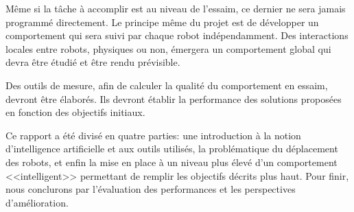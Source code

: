 Même si la tâche à accomplir est au niveau de l'essaim, ce dernier ne sera jamais programmé directement. Le principe même du projet est de développer un comportement qui sera suivi par chaque robot indépendamment. Des interactions locales entre robots, physiques ou non, émergera un comportement global qui devra être étudié et être rendu prévisible.

Des outils de mesure, afin de calculer la qualité du comportement en essaim, devront être élaborés. Ils devront établir la performance des solutions proposées en fonction des objectifs initiaux.~\cite{cahierCharges}

\vspace{1em}Ce rapport a été divisé en quatre parties: une introduction à la notion d'intelligence artificielle et aux outils utilisés, la problématique du déplacement des robots, et enfin la mise en place à un niveau plus élevé d'un comportement <<intelligent>> permettant de remplir les objectifs décrits plus haut. Pour finir, nous conclurons par l'évaluation des performances et les perspectives d'amélioration.
